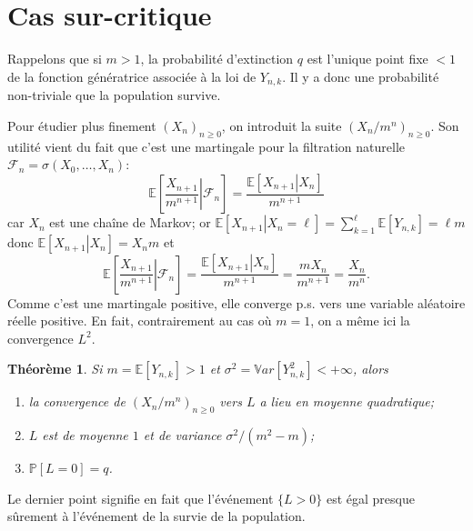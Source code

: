 \documentclass[a4paper,12pt]{book}
\newtheorem{thmfr}{Théorème}[section]
\begin{document}
\section{Cas sur-critique}
Rappelons que si $m> 1$, la probabilité d'extinction $q$ est l'unique point fixe $<1$ de la fonction génératrice associée à la loi de $Y_{n,k}$. Il y a donc une probabilité non-triviale que la population survive.

Pour étudier plus finement $(X_{n})_{n\geq 0}$, on introduit la suite $(X_n/m^n)_{n\geq 0}$. Son utilité vient du fait que c'est une martingale pour la filtration naturelle $\mathcal{F}_n=\sigma(X_0,\ldots,X_n)$:
$$\mathbb{E}\left[\left.\frac{X_{n+1}}{m^{n+1}}\right|\mathcal{F}_n\right]= \frac{\mathbb{E}\left[\left.X_{n+1}\right|X_n\right]}{m^{n+1}}$$
car $X_n$ est une chaîne de Markov; or
$\mathbb{E}\left[\left.X_{n+1}\right|X_n=\ell\right]=\sum_{k=1}^{\ell}\mathbb{E}[Y_{n,k}]=\ell m$
donc $\mathbb{E}\left[\left.X_{n+1}\right|X_n\right]=X_n m$ et
$$\mathbb{E}\left[\left.\frac{X_{n+1}}{m^{n+1}}\right|\mathcal{F}_n\right]= \frac{\mathbb{E}\left[\left.X_{n+1}\right|X_n\right]}{m^{n+1}}=\frac{mX_n}{m^{n+1}}=\frac{X_n}{m^{n}}.$$
Comme c'est une martingale positive, elle converge p.s. vers une variable aléatoire réelle positive. En fait, contrairement au cas où $m=1$, on a même ici la convergence $L^2$.
\begin{thmfr}
Si $m=\mathbb{E}[Y_{n,k}]>1$ et $\sigma^2=\mathbb{V}ar[Y_{n,k}^2]<+\infty$, alors
\begin{enumerate}
\item la convergence de $(X_n/m^n)_{n\geq 0}$ vers $L$ a lieu en moyenne quadratique;
\item $L$ est de moyenne $1$ et de variance $\sigma^2/(m^2-m)$;
\item $\mathbb{P}[L=0]=q$.
\end{enumerate}
\end{thmfr}
Le dernier point signifie en fait que l'événement $\{L>0\}$ est égal presque sûrement à l'événement de la survie de la population.
\end{document}
